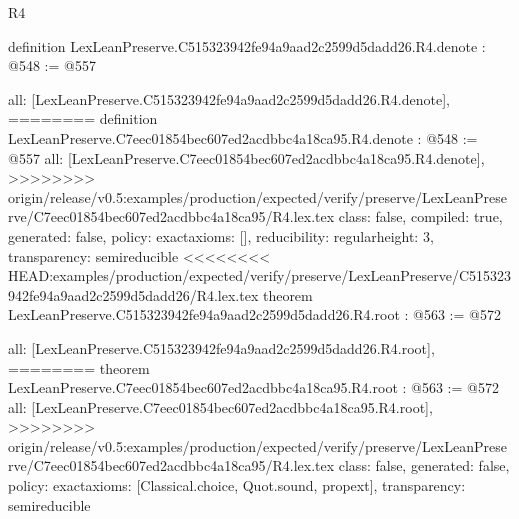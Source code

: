 \begin{lexlean}{R4}
\begin{coremodule}
{{{{{{definition LexLeanPreserve.C515323942fe94a9aad2c2599d5dadd26.R4.denote : @548 := @557 {
  all: [LexLeanPreserve.C515323942fe94a9aad2c2599d5dadd26.R4.denote],
========
definition LexLeanPreserve.C7eec01854bec607ed2acdbbc4a18ca95.R4.denote : @548 := @557 {
  all: [LexLeanPreserve.C7eec01854bec607ed2acdbbc4a18ca95.R4.denote],
>>>>>>>> origin/release/v0.5:examples/production/expected/verify/preserve/LexLeanPreserve/C7eec01854bec607ed2acdbbc4a18ca95/R4.lex.tex
  class: false,
  compiled: true,
  generated: false,
  policy: exact{axioms: []},
  reducibility: regular{height: 3},
  transparency: semireducible
}
<<<<<<<< HEAD:examples/production/expected/verify/preserve/LexLeanPreserve/C515323942fe94a9aad2c2599d5dadd26/R4.lex.tex
theorem LexLeanPreserve.C515323942fe94a9aad2c2599d5dadd26.R4.root : @563 := @572 {
  all: [LexLeanPreserve.C515323942fe94a9aad2c2599d5dadd26.R4.root],
========
theorem LexLeanPreserve.C7eec01854bec607ed2acdbbc4a18ca95.R4.root : @563 := @572 {
  all: [LexLeanPreserve.C7eec01854bec607ed2acdbbc4a18ca95.R4.root],
>>>>>>>> origin/release/v0.5:examples/production/expected/verify/preserve/LexLeanPreserve/C7eec01854bec607ed2acdbbc4a18ca95/R4.lex.tex
  class: false,
  generated: false,
  policy: exact{axioms: [Classical.choice, Quot.sound, propext]},
  transparency: semireducible
}

}}}}}}}}
\end{coremodule}
\end{lexlean}
